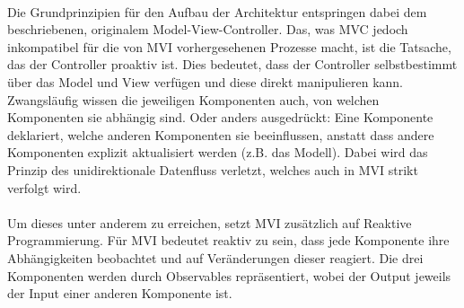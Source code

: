\\
Die Grundprinzipien für den Aufbau der Architektur entspringen dabei dem beschriebenen, originalem Model-View-Controller. Das, was MVC jedoch inkompatibel für die von MVI vorhergesehenen Prozesse macht, ist die Tatsache, das der Controller proaktiv ist. Dies bedeutet, dass der Controller selbstbestimmt über das Model und View verfügen und diese direkt manipulieren kann. Zwangsläufig wissen die jeweiligen Komponenten auch, von welchen Komponenten sie abhängig sind. Oder anders ausgedrückt: Eine Komponente deklariert, welche anderen Komponenten sie beeinflussen, anstatt dass andere Komponenten explizit aktualisiert werden (z.B. das Modell). Dabei wird das Prinzip des unidirektionale Datenfluss verletzt, welches auch in MVI strikt verfolgt wird. 
\\
\\
Um dieses unter anderem zu erreichen, setzt MVI zusätzlich auf Reaktive Programmierung. Für MVI bedeutet reaktiv zu sein, dass jede Komponente ihre Abhängigkeiten beobachtet und auf Veränderungen dieser reagiert. Die drei Komponenten werden durch Observables repräsentiert, wobei der Output jeweils der Input einer anderen Komponente ist.

